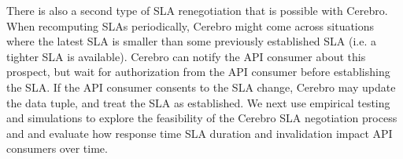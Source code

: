 There is also a second type of SLA renegotiation that is possible with Cerebro.
When recomputing SLAs periodically, Cerebro might come across situations where the latest SLA is smaller
than some previously established SLA (i.e. a tighter SLA is available). Cerebro can notify the 
API consumer about this prospect, but wait for authorization from the API consumer before 
establishing the SLA. If the API consumer consents to the SLA change, Cerebro may update the
data tuple, and treat the SLA as established.
We next use empirical testing and simulations to explore 
the feasibility of the Cerebro SLA negotiation process and 
and evaluate how response time SLA duration and invalidation impact API consumers over time.

